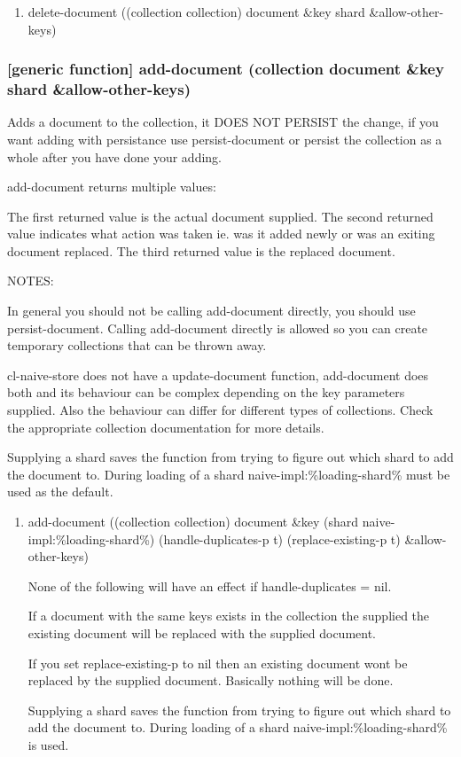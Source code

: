 \documentclass[11pt]{article}
\begin{document}
\begin{enumerate}
\item delete-document ((collection collection) document \&key shard \&allow-other-keys)
\label{sec:org2a6238e}
\end{enumerate}

\subsubsection{[generic function] add-document (collection document \&key shard \&allow-other-keys)}
\label{sec:org8a5b505}

Adds a document to the collection, it DOES NOT PERSIST the change, if
you want adding with persistance use persist-document or persist the
collection as a whole after you have done your adding.

add-document returns multiple values:

The first returned value is the actual document supplied.  The second
returned value indicates what action was taken ie. was it added newly
or was an exiting document replaced.  The third returned value is the
replaced document.

NOTES:

In general you should not be calling add-document directly, you should
use persist-document. Calling add-document directly is allowed so you
can create temporary collections that can be thrown away.

cl-naive-store does not have a update-document function, add-document
does both and its behaviour can be complex depending on the key
parameters supplied. Also the behaviour can differ for different types
of collections. Check the appropriate collection documentation for
more details.

Supplying a shard saves the function from trying to figure out which
shard to add the document to. During loading of a shard
naive-impl:\%loading-shard\% must be used as the default.

\begin{enumerate}
\item add-document ((collection collection) document \&key (shard naive-impl:\%loading-shard\%) (handle-duplicates-p t) (replace-existing-p t) \&allow-other-keys)
\label{sec:org1feaff0}

None of the following will have an effect if handle-duplicates = nil.

If a document with the same keys exists in the collection the supplied
the existing document will be replaced with the supplied document.

If you set replace-existing-p to nil then an existing document wont be
replaced by the supplied document. Basically nothing will be done.

Supplying a shard saves the function from trying to figure out which
shard to add the document to. During loading of a shard
naive-impl:\%loading-shard\% is used.
\end{enumerate}
\end{document}
